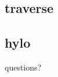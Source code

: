 \documentclass[include/preamble.tex]{subfiles}
\begin{document}
\subsection{traverse}


\subsection{hylo}







{
  \begin{frame}
    \begin{center}
      questions?
    \end{center}
  \end{frame}
}
\end{document}
